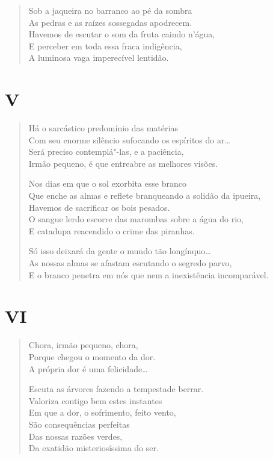 {\begin{verse}
Sob a jaqueira no barranco ao pé da sombra\\
As pedras e as raízes sossegadas apodrecem.\\
Havemos de escutar o som da fruta caindo n'água,\\
E perceber em toda essa fraca indigência,\\
A luminosa vaga imperecível lentidão.
\end{verse}

\medskip
\section*{V}

\begin{verse}
Há o sarcástico predomínio das matérias\\
Com seu enorme silêncio sufocando os espíritos do ar\ldots{}\\
Será preciso contemplá"-las, e a paciência,\\
Irmão pequeno, é que entreabre as melhores visões.

Nos dias em que o sol exorbita esse branco\\
Que enche as almas e reflete branqueando a solidão da ipueira,\\
Havemos de sacrificar os bois pesados.\\
O sangue lerdo escorre das marombas sobre a água do rio,\\
E catadupa reacendido o crime das piranhas.

Só isso deixará da gente o mundo tão longínquo\ldots{}\\
As nossas almas se afastam escutando o segredo parvo,\\
E o branco penetra em nós que nem a inexistência incomparável.
\end{verse}

\medskip
\section*{VI}

\begin{verse}
Chora, irmão pequeno, chora,\\
Porque chegou o momento da dor.\\
A própria dor é uma felicidade\ldots{}

Escuta as árvores fazendo a tempestade berrar.\\
Valoriza contigo bem estes instantes\\
Em que a dor, o sofrimento, feito vento,\\
São consequências perfeitas\\
Das nossas razões verdes,\\
Da exatidão misteriosíssima do ser.


\end{verse}}
